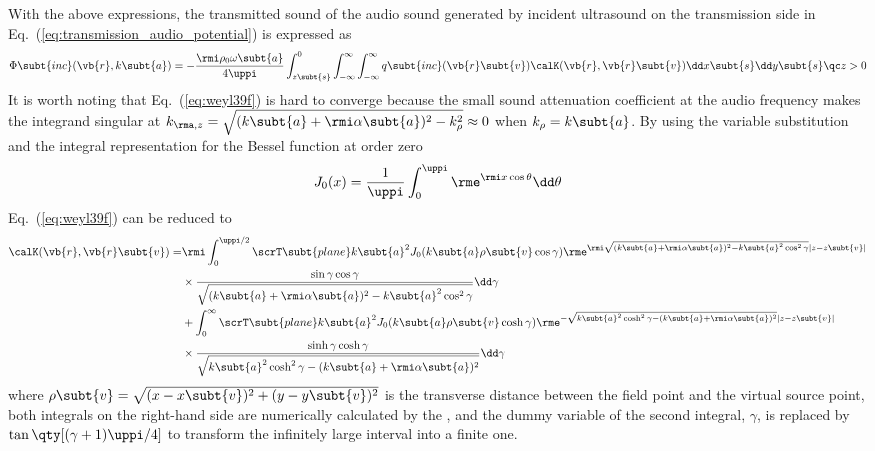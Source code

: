 With the above expressions, the transmitted sound of
the audio sound generated by incident ultrasound on the
transmission side in Eq.~(\ref{eq:transmission_audio_potential}) is expressed as
\begin{equation}
    \Phi\subt{inc}(\vb{r},k\subt{a})
    = -\frac{\rmi\rho_0\omega\subt{a} }{4\uppi}
    \int_{z\subt{s}}^0 
    \int_{-\infty}^\infty
    \int_{-\infty}^\infty
    q\subt{inc}(\vb{r}\subt{v})
    \calK(\vb{r},\vb{r}\subt{v})
    \dd x\subt{s} \dd y\subt{s}
    \qc
    z>0
    \label{eq:partition_inc_potential}
\end{equation}
It is worth noting that Eq.~(\ref{eq:weyl39f}) is hard to converge
because the small sound attenuation coefficient at the audio
frequency makes the integrand singular at $k_{\rma, z} = \sqrt{(k\subt{a}+\rmi \alpha\subt{a})^2 - k_\rho^2} \approx 0$ when $k_\rho = k\subt{a}$. By using the variable
substitution and the integral representation for the
Bessel function at order zero 
\begin{equation}
    J_0(x) = \frac{1}{\uppi}\int_0^\uppi \rme^{\rmi x\cos\theta}\dd \theta
\end{equation}
Eq.~(\ref{eq:weyl39f}) can be reduced to
\begin{equation}
    \begin{split}
        \calK(\vb{r},\vb{r}\subt{v}) 
        = 
        & \rmi \int_0^{\uppi/2}\scrT\subt{plane} k\subt{a}^2 J_0(k\subt{a}\rho\subt{v}\cos\gamma)
        \rme^{\rmi \sqrt{(k\subt{a}+\rmi \alpha\subt{a})^2 - k\subt{a}^2 \cos^2\gamma} |z-z\subt{v}|} \\
        & \times \frac{\sin\gamma \cos\gamma }{\sqrt{(k\subt{a}+\rmi \alpha\subt{a})^2-k\subt{a}^2\cos^2\gamma}} \dd \gamma\\
        & + \int_0^{\infty}\scrT\subt{plane} k\subt{a}^2 J_0(k\subt{a}\rho\subt{v}\cosh\gamma)
    \rme^{-\sqrt{k\subt{a}^2 \cosh^2 \gamma - (k\subt{a}+\rmi \alpha\subt{a})^2 }|z-z\subt{v}|} \\
        & \times \frac{\sinh\gamma \cosh\gamma }{\sqrt{k\subt{a}^2 \cosh^2\gamma -(k\subt{a}+\rmi \alpha\subt{a})^2}} \dd \gamma
    \end{split}
\end{equation}
where $\rho\subt{v} = \sqrt{(x-x\subt{v})^2 + (y-y\subt{v})^2}$ is the transverse distance
between the field point and the virtual source point, both integrals
on the right-hand side are numerically calculated by the
, and the dummy variable of the
second integral, $\gamma$, is replaced by $\tan\qty[(\gamma+1)\uppi/4]$ to transform
the infinitely large interval into a finite one.

